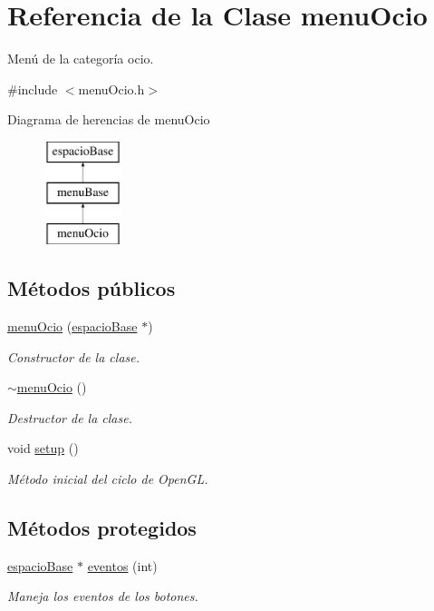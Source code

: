 \hypertarget{classmenu_ocio}{}\section{Referencia de la Clase menu\+Ocio}
\label{classmenu_ocio}


Menú de la categoría ocio.  




{\ttfamily \#include $<$menu\+Ocio.\+h$>$}

Diagrama de herencias de menu\+Ocio\begin{figure}[H]
\begin{center}
\leavevmode
\includegraphics[height=3.000000cm]{classmenu_ocio}
\end{center}
\end{figure}
\subsection*{Métodos públicos}
\begin{DoxyCompactItemize}
\item 
\hyperlink{classmenu_ocio_a8da970ed63504b0071f9ba0472ef74d5}{menu\+Ocio} (\hyperlink{classespacio_base}{espacio\+Base} $\ast$)
\begin{DoxyCompactList}\small\item\em Constructor de la clase. \end{DoxyCompactList}\item 
\hyperlink{classmenu_ocio_ab0efb299b639818adafec4d91fd83c9e}{$\sim$menu\+Ocio} ()
\begin{DoxyCompactList}\small\item\em Destructor de la clase. \end{DoxyCompactList}\item 
void \hyperlink{classmenu_ocio_a6b99292a5b8c60b5a8a799447fc85f18}{setup} ()
\begin{DoxyCompactList}\small\item\em Método inicial del ciclo de Open\+G\+L. \end{DoxyCompactList}\end{DoxyCompactItemize}
\subsection*{Métodos protegidos}
\begin{DoxyCompactItemize}
\item 
\hyperlink{classespacio_base}{espacio\+Base} $\ast$ \hyperlink{classmenu_ocio_ab64d85113d3df4d1ba3b7599b89d0598}{eventos} (int)
\begin{DoxyCompactList}\small\item\em Maneja los eventos de los botones. \end{DoxyCompactList}\end{DoxyCompactItemize}
